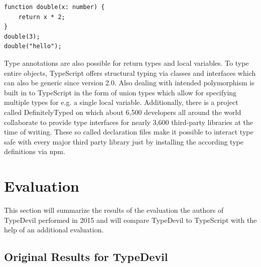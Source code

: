 \documentclass[runningheads,a4paper]{llncs}
\begin{document}
\medskip\medskip
\lstset{language=javascript}
\begin{minipage}{\linewidth}
\begin{lstlisting}[frame=single, caption=Type Annotations, label={lst:TypeAnnotations}]
function double(x: number) {
    return x * 2;
}
double(3);
double("hello");
\end{lstlisting}
\end{minipage}
Type annotations are also possible for return types and local variables.
To type entire objects, TypeScript offers structural typing via classes and interfaces which can also be generic since version 2.0.
Also dealing with intended polymorphism is built in to TypeScript in the form of union types which allow for specifying multiple types for e.g. a single local variable.
Additionally, there is a project called DefinitelyTyped \cite{DefinitelyTyped} on which about 6,500 developers all around the world collaborate to provide type interfaces for nearly 3,600 third-party libraries at the time of writing.
These so called declaration files make it possible to interact type safe with every major third party library just by installing the according type definitions via npm.

\section{Evaluation}

This section will summarize the results of the evaluation the authors of TypeDevil performed in 2015 and will compare TypeDevil to TypeScript with the help of an additional evaluation.

\subsection{Original Results for TypeDevil}
\end{document}
